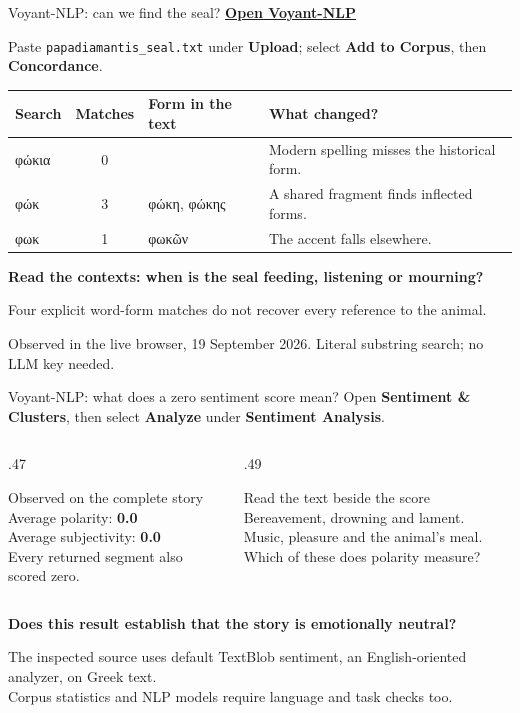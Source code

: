 \documentclass[aspectratio=169,10pt]{beamer}
\newcommand{\key}[1]{\textcolor{aegean}{\textbf{#1}}}
\newcommand{\source}[1]{\vfill{\scriptsize\color{slate}#1\par}}
\newcommand{\question}[1]{\medskip\par\key{#1}\par}
\begin{document}
\begin{frame}{Voyant-NLP: can we find the seal?}
  \href{https://greek-app-heaven-voyant.livelyhill-85880e66.westeurope.azurecontainerapps.io}{\textbf{Open Voyant-NLP}}\par\medskip
  \small Paste \texttt{papadiamantis\_seal.txt} under \textbf{Upload}; select \textbf{Add to Corpus}, then \textbf{Concordance}.\par\medskip
  \begin{tabularx}{\textwidth}{@{}lclX@{}}
    \toprule
    \textbf{Search} & \textbf{Matches} & \textbf{Form in the text} & \textbf{What changed?}\\
    \midrule
    φώκια & 0 & & Modern spelling misses the historical form.\\[5pt]
    φώκ & 3 & φώκη, φώκης & A shared fragment finds inflected forms.\\[5pt]
    φωκ & 1 & φωκῶν & The accent falls elsewhere.\\
    \bottomrule
  \end{tabularx}
  \question{Read the contexts: when is the seal feeding, listening or mourning?}
  \small Four explicit word-form matches do not recover every reference to the animal.
  \source{Observed in the live browser, 19 September 2026. Literal substring search; no LLM key needed.}
\end{frame}

\begin{frame}{Voyant-NLP: what does a zero sentiment score mean?}
  \small Open \textbf{Sentiment \& Clusters}, then select \textbf{Analyze} under \textbf{Sentiment Analysis}.
  \begin{columns}[T]
    \begin{column}{.47\textwidth}
      \begin{block}{Observed on the complete story}
        Average polarity: \key{0.0}\\[6pt]
        Average subjectivity: \key{0.0}\\[6pt]
        Every returned segment also scored zero.
      \end{block}
    \end{column}
    \begin{column}{.49\textwidth}
      \begin{block}{Read the text beside the score}
        Bereavement, drowning and lament.\\[6pt]
        Music, pleasure and the animal's meal.\\[6pt]
        Which of these does polarity measure?
      \end{block}
    \end{column}
  \end{columns}
  \question{Does this result establish that the story is emotionally neutral?}
  \source{The inspected source uses default TextBlob sentiment, an English-oriented analyzer, on Greek text.\\
  Corpus statistics and NLP models require language and task checks too.}
\end{frame}
\end{document}

